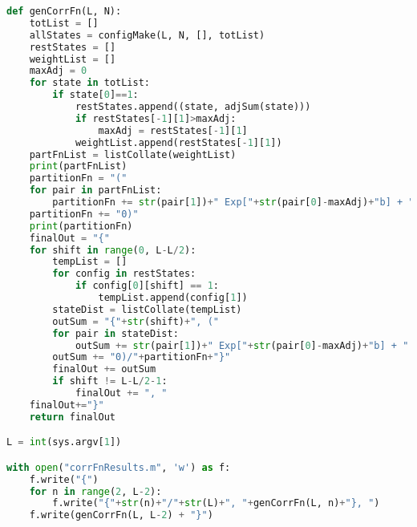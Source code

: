 \begin{lstlisting}[language=Python]
def genCorrFn(L, N):
    totList = []
    allStates = configMake(L, N, [], totList)
    restStates = []
    weightList = []
    maxAdj = 0
    for state in totList:
        if state[0]==1:
            restStates.append((state, adjSum(state)))
            if restStates[-1][1]>maxAdj:
                maxAdj = restStates[-1][1]
            weightList.append(restStates[-1][1])
    partFnList = listCollate(weightList)
    print(partFnList)
    partitionFn = "("
    for pair in partFnList:
        partitionFn += str(pair[1])+" Exp["+str(pair[0]-maxAdj)+"b] + "
    partitionFn += "0)"
    print(partitionFn)
    finalOut = "{"
    for shift in range(0, L-L/2):
        tempList = []
        for config in restStates:
            if config[0][shift] == 1:
                tempList.append(config[1])
        stateDist = listCollate(tempList)
        outSum = "{"+str(shift)+", ("
        for pair in stateDist:
            outSum += str(pair[1])+" Exp["+str(pair[0]-maxAdj)+"b] + "
        outSum += "0)/"+partitionFn+"}"
        finalOut += outSum
        if shift != L-L/2-1:
            finalOut += ", "
    finalOut+="}"
    return finalOut

L = int(sys.argv[1])

with open("corrFnResults.m", 'w') as f:
    f.write("{")
    for n in range(2, L-2):
        f.write("{"+str(n)+"/"+str(L)+", "+genCorrFn(L, n)+"}, ")
    f.write(genCorrFn(L, L-2) + "}")
\end{lstlisting}